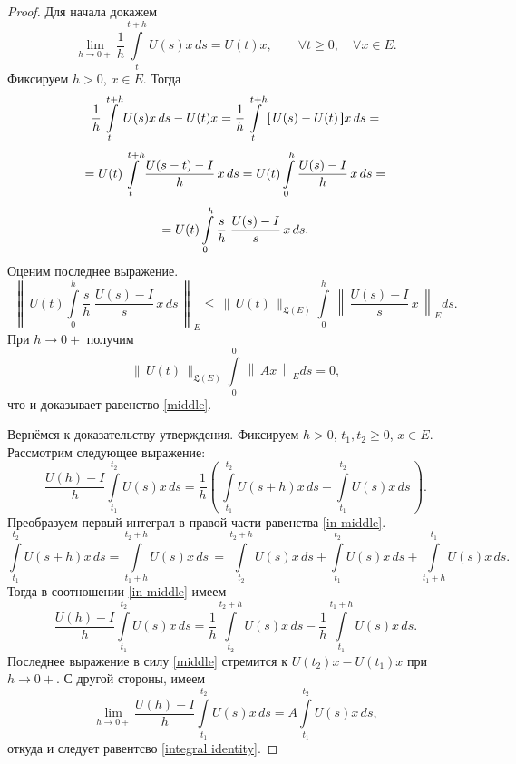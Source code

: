 \documentclass{article}
\renewcommand{\le}{\leqslant}
\renewcommand{\ge}{\geqslant}
\newcommand{\h}{\textsf}
\theoremstyle{definition}
\begin{document}
\begin{proof}
	Для начала докажем
	\begin{equation} \label{middle}
		\lim\limits_{h \rightarrow 0+} \frac{1}{h} \int\limits_{t}^{t + h} U(s)x\,ds = U(t)x, 
		\qquad \forall t \ge 0, \quad  \forall x \in E.
	\end{equation}
	Фиксируем $h > 0$, $x \in E$. Тогда
	\begin{gather*}
		\frac{1}{h} \int\limits_{t}^{t + h} U(s)x\,ds - U(t)x = 
		\frac{1}{h} \int\limits_{t}^{t + h} \h[\, U(s) - U(t) \,\h]x\,ds = \\[1mm]
		= U(t) \int\limits_{t}^{t + h} \frac{U(s - t) - I}{h}\,x\,ds =
		U(t) \int\limits_{0}^{h} \frac{U(s) - I}{h}\,x\,ds = \\[1mm]
		= U(t) \int\limits_{0}^{h} \frac{s}{h} \; \frac{U(s) - I}{s}\,x\,ds.
	\end{gather*}
	Оценим последнее выражение.
	\begin{equation*}
		\left\|\, U(t) \int\limits_{0}^{h} \frac{s}{h} \; \frac{U(s) - I}{s}\,x\,ds \,\right\|_E
		\le \,\|\, U(t) \,\|_{\mathfrak{L}(E)} \int\limits_{0}^{h} \, \left\|\, \frac{U(s) - I}{s}\,x \,\right\|_E ds.
	\end{equation*}
	При $ h \rightarrow 0+ $ получим 
	\begin{equation*}
		\|\, U(t) \,\|_{\mathfrak{L}(E)} \int\limits_{0}^{0} \, \left\|\, Ax \,\right\|_E ds = 0,
	\end{equation*}
	что и доказывает равенство \eqref{middle}. 
	
	Вернёмся к доказательству утверждения. Фиксируем $h > 0$, $t_1, t_2 \ge 0$, $x \in E$. 
	Рассмотрим следующее выражение:
	\begin{equation} \label{in middle}
		\frac{U(h) - I}{h} \int\limits_{t_1}^{t_2} U(s)x \,ds = \frac{1}{h} 
		\left(\, \int\limits_{t_1}^{t_2} U(s + h)x \,ds - \int\limits_{t_1}^{t_2} U(s)x \,ds \,\right).
	\end{equation}
	Преобразуем первый интеграл в правой части равенства \eqref{in middle}.
	\begin{equation*}
		\int\limits_{t_1}^{t_2} U(s + h)x \,ds = \int\limits_{t_1 + h}^{t_2 + h} U(s)x \,ds\, = 
		\int\limits_{t_2}^{t_2 + h} U(s)x \,ds + \int\limits_{t_1}^{t_2} U(s)x \,ds + \int\limits_{t_1 + h}^{t_1} U(s)x \,ds.
	\end{equation*}
	Тогда в соотношении \eqref{in middle} имеем
	\begin{equation*}
		\frac{U(h) - I}{h} \int\limits_{t_1}^{t_2} U(s)x \,ds =  
		\frac{1}{h} \int\limits_{t_2}^{t_2 + h} U(s)x \,ds - \frac{1}{h} \int\limits_{t_1}^{t_1 + h} U(s)x \,ds.
	\end{equation*}
	Последнее выражение в силу \eqref{middle} стремится к $ U(t_2)x - U(t_1)x $ при $ h \rightarrow 0+ $. С другой стороны,
	имеем
	\begin{equation*}
		\lim\limits_{h \rightarrow 0+} \frac{U(h) - I}{h} \int\limits_{t_1}^{t_2} U(s)x \,ds = A\int\limits_{t_1}^{t_2} U(s)x \,ds,
	\end{equation*}
	откуда и следует равентсво \eqref{integral identity}.
\end{proof}
\end{document}
